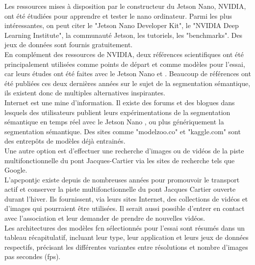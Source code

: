 ﻿\noindent Les ressources mises à disposition par le constructeur du Jetson Nano, NVIDIA, ont été étudiées pour apprendre et tester le nano ordinateur. Parmi les plus intéressantes, on peut citer le "Jetson Nano Developer Kit", le "NVIDIA Deep Learning Institute", la communauté Jetson, les tutoriels, les "benchmarks". Des jeux de données sont fournis gratuitement.
\vspace{\baselineskip}
\\
\noindent En complément des ressources de NVIDIA, deux références scientifiques ont été principalement utilisées comme points de départ et comme modèles pour l'essai, car leurs études ont été faites avec le Jetson Nano \parencite{nguyen_mavnet_2019} et \parencite{chong_real-time_1992}. Beaucoup de références ont été publiées ces deux dernières années sur le sujet de la segmentation sémantique, ils existent donc de multiples alternatives inspirantes.
\vspace{\baselineskip}
\\
\noindent Internet est une mine d'information. Il existe des forums et des blogues dans lesquels des utilisateurs publient leurs expérimentations de la segmentation sémantique en temps réel avec le Jetson Nano \parencite{dustin_realtime_2019}, ou plus génériquement la segmentation sémantique. Des sites comme "modelzoo.co" et "kaggle.com" sont des entrepôts de modèles déjà entrainés. 
\vspace{\baselineskip}
\\
\noindent Une autre option est d'effectuer une recherche d'images ou de vidéos de la piste multifonctionnelle du pont Jacques-Cartier via les sites de recherche tels que Google. 
\vspace{\baselineskip}
\\
\noindent L'\acrlong{apcpontjc} existe depuis de nombreuses années pour promouvoir le transport actif et conserver la piste multifonctionnelle du pont Jacques Cartier ouverte durant l'hiver. Ils fournissent, via leurs sites Internet, des collections de vidéos et d'images qui pourraient être utilisées. Il serait aussi possible d'entrer en contact avec l'association et leur demander de prendre de nouvelles vidéos. \parencite{association_des_pietons_et_cyclistes_du_pont_jacques-cartier_pontjacques-cartier365com_2020} \parencite{association_des_pietons_et_cyclistes_pont_jacques-cartier_flickr_2020}
\vspace{\baselineskip}
\\
\noindent Les architectures des modèles \acrshort{fcn} sélectionnés pour l'essai sont résumés dans un tableau récapitulatif, incluant leur type, leur application et leurs jeux de données respectifs, précisant les différentes variantes entre résolutions et nombre d'images pas secondes (\acrshort{fps}).